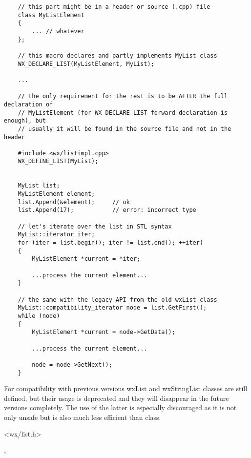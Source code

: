 \begin{verbatim}
    // this part might be in a header or source (.cpp) file
    class MyListElement
    {
        ... // whatever
    };

    // this macro declares and partly implements MyList class
    WX_DECLARE_LIST(MyListElement, MyList);

    ...

    // the only requirement for the rest is to be AFTER the full declaration of
    // MyListElement (for WX_DECLARE_LIST forward declaration is enough), but
    // usually it will be found in the source file and not in the header

    #include <wx/listimpl.cpp>
    WX_DEFINE_LIST(MyList);


    MyList list;
    MyListElement element;
    list.Append(&element);     // ok
    list.Append(17);           // error: incorrect type

    // let's iterate over the list in STL syntax
    MyList::iterator iter;
    for (iter = list.begin(); iter != list.end(); ++iter)
    {
        MyListElement *current = *iter;

        ...process the current element...
    }

    // the same with the legacy API from the old wxList class
    MyList::compatibility_iterator node = list.GetFirst();
    while (node)
    {
        MyListElement *current = node->GetData();

        ...process the current element...
        
        node = node->GetNext();
    }

\end{verbatim}

For compatibility with previous versions wxList and wxStringList classes are
still defined, but their usage is deprecated and they will disappear in the
future versions completely. The use of the latter is especially discouraged as
it is not only unsafe but is also much less efficient than
 class.


<wx/list.h>




,


